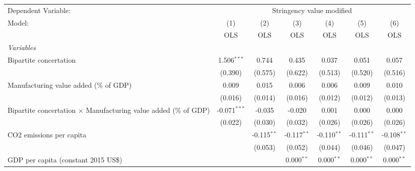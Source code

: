 
\begingroup
\centering
\begin{tabular}{lcccccc}
   \toprule
   Dependent Variable: & \multicolumn{6}{c}{Stringency value modified}\\
   Model:                                                                  & (1)            & (2)           & (3)           & (4)            & (5)            & (6)\\  
                                                                           &  OLS           & OLS           & OLS           & OLS            & OLS            & OLS\\  
   \midrule
   \emph{Variables}\\
   Bipartite concertation                                                  & 1.506$^{***}$  & 0.744         & 0.435         & 0.037          & 0.051          & 0.057\\   
                                                                           & (0.390)        & (0.575)       & (0.622)       & (0.513)        & (0.520)        & (0.516)\\   
   Manufacturing value added (\% of GDP)                                   & 0.009          & 0.015         & 0.006         & 0.006          & 0.009          & 0.010\\   
                                                                           & (0.016)        & (0.014)       & (0.016)       & (0.012)        & (0.012)        & (0.013)\\   
   Bipartite concertation $\times$ Manufacturing value added (\% of GDP)   & -0.071$^{***}$ & -0.035        & -0.020        & 0.001          & 0.000          & 0.000\\   
                                                                           & (0.022)        & (0.030)       & (0.032)       & (0.026)        & (0.026)        & (0.026)\\   
   CO2 emissions per capita                                                &                & -0.115$^{**}$ & -0.117$^{**}$ & -0.110$^{**}$  & -0.111$^{**}$  & -0.108$^{**}$\\   
                                                                           &                & (0.053)       & (0.052)       & (0.044)        & (0.046)        & (0.047)\\   
   GDP per capita (constant 2015 US\$)                                     &                &               & 0.000$^{**}$  & 0.000$^{**}$   & 0.000$^{**}$   & 0.000$^{**}$\\   

\end{tabular}
